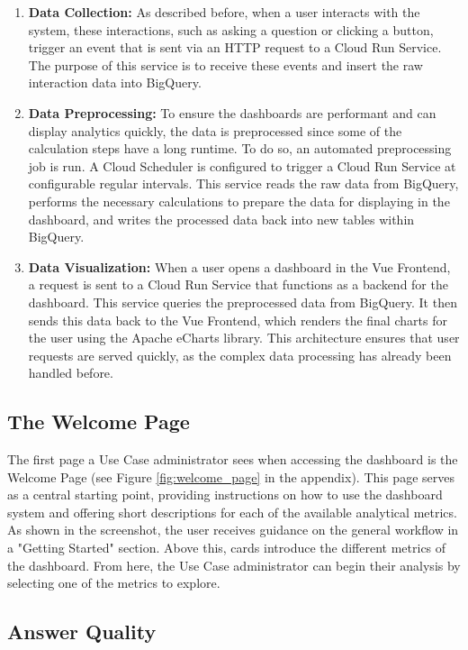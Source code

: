 \documentclass[
	english,
	ruledheaders=section,%
	class=report,%
	thesis={type=bachelor},%
	accentcolor=1b,%
	custommargins=true,%
	marginpar=false,%
	parskip=half-,%
	fontsize=11pt,%
	DIV=14,
]{tudapub}
\begin{document}
\begin{enumerate}
    \item \textbf{Data Collection:} As described before, when a user interacts with the system, these interactions, such as asking a question or clicking a button, trigger an event that is sent via an HTTP request to a Cloud Run Service. The purpose of this service is to receive these events and insert the raw interaction data into BigQuery.

    \item \textbf{Data Preprocessing:} To ensure the dashboards are performant and can display analytics quickly, the data is preprocessed since some of the calculation steps have a long runtime. To do so, an automated preprocessing job is run. A Cloud Scheduler \parencite{googlecloudscheduler} is configured to trigger a Cloud Run Service at configurable regular intervals. This service reads the raw data from BigQuery, performs the necessary calculations to prepare the data for displaying in the dashboard, and writes the processed data back into new tables within BigQuery.

    \item \textbf{Data Visualization:} When a user opens a dashboard in the Vue Frontend, a request is sent to a Cloud Run Service that functions as a backend for the dashboard. This service queries the preprocessed data from BigQuery. It then sends this data back to the Vue Frontend, which renders the final charts for the user using the Apache eCharts \parencite{apache_echarts} library. This architecture ensures that user requests are served quickly, as the complex data processing has already been handled before.
\end{enumerate}
\subsection{The Welcome Page}
The first page a Use Case administrator sees when accessing the dashboard is the Welcome Page (see Figure \ref{fig:welcome_page} in the appendix). This page serves as a central starting point, providing instructions on how to use the dashboard system and offering short descriptions for each of the available analytical metrics. As shown in the screenshot, the user receives guidance on the general workflow in a "Getting Started" section. Above this, cards introduce the different metrics of the dashboard. From here, the Use Case administrator can begin their analysis by selecting one of the metrics to explore.
\subsection{Answer Quality}
\end{document}
